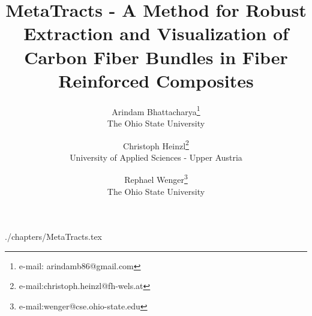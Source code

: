 \documentclass{vgtc}                          %
\title{MetaTracts - A Method for Robust Extraction and Visualization of Carbon Fiber Bundles in Fiber Reinforced Composites}
\author{Arindam Bhattacharya\thanks{e-mail: arindamb86@gmail.com}\\ %
        \scriptsize The Ohio State University %
\and Christoph Heinzl\thanks{e-mail:christoph.heinzl@fh-wels.at}\\ %
     \scriptsize University of Applied Sciences - Upper Austria%
\and Rephael Wenger\thanks{e-mail:wenger@cse.ohio-state.edu}\\ %
    \scriptsize The Ohio State University}
\begin{document}


\maketitle

 {./chapters/MetaTracts.tex}





\end{document}
